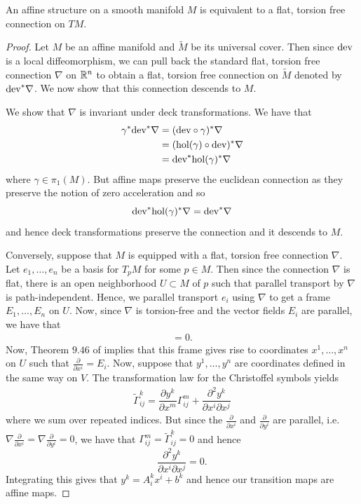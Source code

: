 \begin{lemma}
    An affine structure on a smooth manifold $M$ is equivalent to a flat, torsion free connection on $TM$.
\end{lemma}
\begin{proof}
    Let $M$ be an affine manifold and $\tilde{M}$ be its universal cover. Then since $\text{dev}$ is a local diffeomorphism, we can pull back the standard flat, torsion free
    connection $\nabla$ on $\mathbb{R}^n$ to obtain a flat, torsion free connection on $\tilde{M}$ denoted by $\text{dev}^* \nabla$. We now show that this connection descends to $M$.

    We show that $\nabla$ is invariant under deck transformations. We have that
    \begin{align*}
        \gamma^* \text{dev}^* \nabla & = (\text{dev} \circ \gamma)^* \nabla       \\
                               & = (\text{hol}(\gamma) \circ \text{dev})^* \nabla \\
                               & = \text{dev}^* \text{hol}(\gamma)^* \nabla
    \end{align*}
    where $\gamma \in \pi_1(M)$. But affine maps preserve the euclidean connection as they preserve the notion of zero acceleration and so
    $$
        \text{dev}^*\text{hol}(\gamma)^* \nabla = \text{dev}^*\nabla
    $$
    and hence deck transformations preserve the connection and it descends to $M$.

    Conversely, suppose that $M$ is equipped with a flat, torsion free connection
    $\nabla$. Let $e_1, \dots , e_n$ be a basis for $T_pM$ for some $p \in M$. Then
    since the connection $\nabla$ is flat, there is an open neighborhood $U \subset
        M$ of $p$ such that parallel transport by $\nabla$ is path-independent. Hence,
    we parallel transport $e_i$ using $\nabla$ to get a frame $E_1, \dots , E_n$ on
    $U$. Now, since $\nabla$ is torsion-free and the vector fields $E_i$ are
    parallel, we have that
    \begin{align*}
        [E_i, E_j] = 0.
    \end{align*}
    Now, Theorem  $9.46$ of \cite{lee2003introduction} implies that this frame gives rise to coordinates $x^1, \dots , x^n$ on $U$ such that
    $\frac{\partial}{\partial x^i} = E_i$. Now, suppose that $y^1, \dots , y^n$ are coordinates defined in the same way on $V$. The transformation
    law for the Christoffel symbols yields
    \begin{align*}
        \tilde{\Gamma}_{ij}^k = \dfrac{\partial y^k}{\partial x^m}\Gamma_{ij}^m + \dfrac{\partial^2 y^k}{\partial x^i \partial x^j}
    \end{align*}
    where we sum over repeated indices. But since the $\frac{\partial}{\partial x^i}$ and $\frac{\partial}{\partial y^i}$ are parallel, i.e. $\nabla \frac{\partial}{\partial x^i}= \nabla \frac{\partial}{\partial y^i} = 0$, we have that $\Gamma_{ij}^m =  \tilde{\Gamma}_{ij}^k =0$ and hence
    $$
        \dfrac{\partial^2 y^k}{\partial x^i \partial x^j} = 0.
    $$
    Integrating this gives that $y^k = A_i^k x^i + b^k$ and hence our transition maps are affine maps.
\end{proof}
